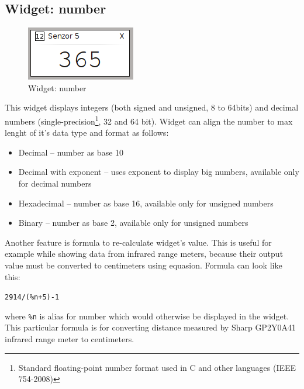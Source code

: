 \documentclass[12pt, a4paper, oneside]{article}
\begin{document}
\subsection{Widget: number}
\begin{figure}[h]
\begin{center}
\includegraphics[scale=1]{img/w_num.png}
\caption{Widget: number}
\end{center}
\end{figure}
This widget displays integers (both signed and unsigned, 8 to 64bits) and decimal numbers (single-precision\footnote{Standard floating-point number format used in C and other languages (IEEE 754-2008)}, 32 and 64 bit).
Widget can align the number to max lenght of it's data type and format as follows:
\begin{itemize}
    \item Decimal -- number as base 10
    \item Decimal with exponent -- uses exponent to display big numbers, available only for decimal numbers
    \item Hexadecimal -- number as base 16, available only for unsigned numbers
    \item Binary -- number as base 2, available only for unsigned numbers
\end{itemize}

Another feature is formula to re-calculate widget's value. This is useful for example while showing data from infrared range meters, because their output value must be converted to centimeters using equasion. Formula can look like this:
\begin{center}
\verb|2914/(%n+5)-1|
\end{center}
where \verb|%n| is alias for number which would otherwise be displayed in the widget. This particular formula is for converting distance measured by Sharp GP2Y0A41 infrared range meter to centimeters.
\end{document}
